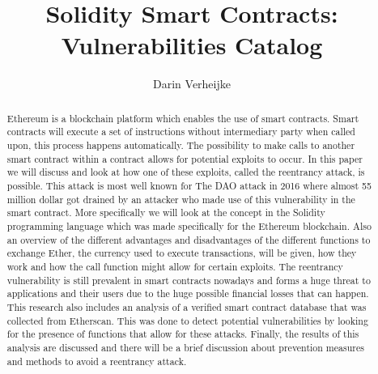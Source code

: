 \documentclass[sigconf]{acmart}
\begin{document}
\title{Solidity Smart Contracts: Vulnerabilities Catalog}

\author{Darin Verheijke}



\renewcommand{\shortauthors}{Trovato and Tobin, et al.}

\begin{abstract}
    Ethereum is a blockchain platform which enables the use of smart contracts. Smart contracts will execute a set of instructions without intermediary party when called upon, this process happens automatically. The possibility to make calls to another smart contract within a contract allows for potential exploits to occur. In this paper we will discuss and look at how one of these exploits, called the reentrancy attack, is possible. This attack is most well known for The DAO attack in 2016 where almost 55 million dollar got drained by an attacker who made use of this vulnerability in the smart contract. More specifically we will look at the concept in the Solidity programming language which was made specifically for the Ethereum blockchain. Also an overview of the different advantages and disadvantages of the different functions to exchange Ether, the currency used to execute transactions, will be given, how they work and how the call function might allow for certain exploits. The reentrancy vulnerability is still prevalent in smart contracts nowadays and forms a huge threat to applications and their users due to the huge possible financial losses that can happen. This research also includes an analysis of a verified smart contract database that was collected from Etherscan. This was done to detect potential vulnerabilities by looking for the presence of functions that allow for these attacks. Finally, the results of this analysis are discussed and there will be a brief discussion about prevention measures and methods to avoid a reentrancy attack.
\end{abstract}
\end{document}
